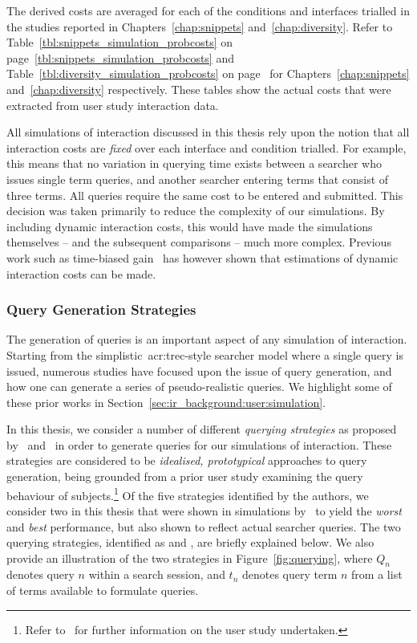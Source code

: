 The derived costs are averaged for each of the conditions and interfaces trialled in the studies reported in Chapters~\ref{chap:snippets} and~\ref{chap:diversity}. Refer to Table~\ref{tbl:snippets_simulation_probcosts} on page~\ref{tbl:snippets_simulation_probcosts} and Table~\ref{tbl:diversity_simulation_probcosts} on page~\pageref{tbl:diversity_simulation_probcosts} for Chapters~\ref{chap:snippets} and~\ref{chap:diversity} respectively. These tables show the actual costs that were extracted from user study interaction data.

All simulations of interaction discussed in this thesis rely upon the notion that all interaction costs are \emph{fixed} over each interface and condition trialled. For example, this means that no variation in querying time exists between a searcher who issues single term queries, and another searcher entering terms that consist of three terms. All queries require the same cost to be entered and submitted. This decision was taken primarily to reduce the complexity of our simulations. By including dynamic interaction costs, this would have made the simulations themselves -- and the subsequent comparisons -- much more complex. Previous work such as time-biased gain~\citep{smucker2012tbg} has however shown that estimations of dynamic interaction costs can be made.

\subsubsection{Query Generation Strategies}\label{sec:method:simulation:grounding:querying}
The generation of queries is an important aspect of any simulation of interaction. Starting from the simplistic~\gls{acr:trec}-style searcher model where a single query is issued, numerous studies have focused upon the issue of query generation, and how one can generate a series of pseudo-realistic queries. We highlight some of these prior works in Section~\ref{sec:ir_background:user:simulation}.

In this thesis, we consider a number of different \emph{querying strategies} as proposed by~\cite{keskustalo2009querying} and~\cite{baskaya2013behavioural_factors} in order to generate queries for our simulations of interaction. These strategies are considered to be \emph{idealised, prototypical} approaches to query generation, being grounded from a prior user study examining the query behaviour of subjects.\footnote{Refer to~\cite{keskustalo2009querying} for further information on the user study undertaken.} Of the five strategies identified by the authors, we consider two in this thesis that were shown in simulations by~\cite{keskustalo2009querying} to yield the \emph{worst} and \emph{best} performance, but also shown to reflect actual searcher queries. The two querying strategies, identified as  and , are briefly explained below. We also provide an illustration of the two strategies in Figure~\ref{fig:querying}, where $Q_n$ denotes query $n$ within a search session, and $t_n$ denotes query term $n$ from a list of terms available to formulate queries.

